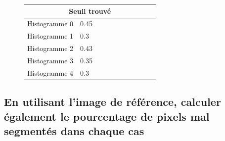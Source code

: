 \documentclass[a4paper,12pt]{report}
\begin{document}
\begin{figure}[htp]

\begin{center}
\begin{longtable}[c]{|p{0.4\linewidth}| p{0.6\linewidth}|} 

	\hline
		\multicolumn{2}{|c|}{Seuil trouvé} \\ \hline
	Histogramme 0	&	 0.45\\ \hline
	Histogramme 1	&	 0.3\\ \hline
	Histogramme 2	&	 0.43\\	 \hline
	Histogramme 3	&	 0.35\\ \hline
	Histogramme 4	&	 0.3\\ \hline
	
\end{longtable}
\end{center}
\end{figure}

\newpage

\subsection*{En utilisant l'image de référence, calculer également le pourcentage de pixels mal segmentés dans chaque cas}
\end{document}
